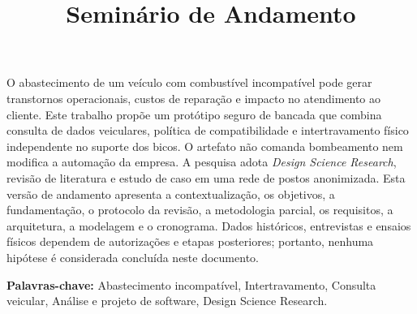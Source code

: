 \documentclass[12pt]{article}
\title{Seminário de Andamento\\[0.35em]\large \TituloTCC}
\author{\AutorTCC}
\begin{document}
\raggedbottom

\maketitle

\begin{center}
\end{center}

\begin{resumo}
O abastecimento de um veículo com combustível incompatível pode gerar
transtornos operacionais, custos de reparação e impacto no atendimento ao
cliente. Este trabalho propõe um protótipo seguro de bancada que combina
consulta de dados veiculares, política de compatibilidade e intertravamento
físico independente no suporte dos bicos. O artefato não comanda bombeamento
nem modifica a automação da empresa. A pesquisa adota \textit{Design Science
Research}, revisão de literatura e estudo de caso em uma rede de postos
anonimizada. Esta versão de andamento apresenta a contextualização, os
objetivos, a fundamentação, o protocolo da revisão, a metodologia parcial, os
requisitos, a arquitetura, a modelagem e o cronograma. Dados históricos,
entrevistas e ensaios físicos dependem de autorizações e etapas posteriores;
portanto, nenhuma hipótese é considerada concluída neste documento.

\par\smallskip\noindent\textbf{Palavras-chave:} Abastecimento incompatível,
Intertravamento, Consulta veicular, Análise e projeto de software, Design
Science Research.
\end{resumo}














\begingroup
\footnotesize


\endgroup
\end{document}
